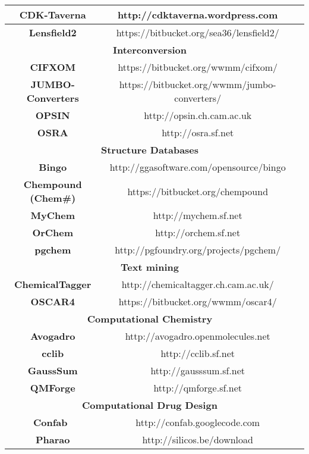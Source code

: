 \documentclass[10pt]{bmc_article}
\newenvironment{bmcformat}{\fussy\setboolean{publ}{true}}{\fussy}
\begin{document}
\begin{bmcformat}
{\begin{tabular}{|c|c|c|}
        \textbf{CDK-Taverna} & http://cdktaverna.wordpress.com \\ \hline
        \textbf{Lensfield2} & https://bitbucket.org/sea36/lensfield2/ \\ \hline
        \multicolumn{2}{|c|}{\textbf{Interconversion}} \\ \hline
        \textbf{CIFXOM} \cite{DayEtAl2011} & https://bitbucket.org/wwmm/cifxom/  \\ \hline
        \textbf{JUMBO-Converters} & https://bitbucket.org/wwmm/jumbo-converters/ \\ \hline
        \textbf{OPSIN} & http://opsin.ch.cam.ac.uk \\ \hline
        \textbf{OSRA} & http://osra.sf.net \\ \hline
        \multicolumn{2}{|c|}{\textbf{Structure Databases}} \\ \hline
        \textbf{Bingo}  & http://ggasoftware.com/opensource/bingo \\ \hline
        \textbf{Chempound (Chem\#)} & https://bitbucket.org/chempound \\ \hline
        \textbf{MyChem}  & http://mychem.sf.net \\ \hline
        \textbf{OrChem} & http://orchem.sf.net \\ \hline
        \textbf{pgchem}  & http://pgfoundry.org/projects/pgchem/ \\ \hline
        \multicolumn{2}{|c|}{\textbf{Text mining}} \\ \hline
        \textbf{ChemicalTagger} \cite{HawizyEtAl2011} & http://chemicaltagger.ch.cam.ac.uk/ \\ \hline
        \textbf{OSCAR4} & https://bitbucket.org/wwmm/oscar4/ \\ \hline
        \multicolumn{2}{|c|}{\textbf{Computational Chemistry}} \\ \hline
        \textbf{Avogadro} & http://avogadro.openmolecules.net \\ \hline
        \textbf{cclib}  & http://cclib.sf.net \\ \hline
        \textbf{GaussSum}  & http://gausssum.sf.net \\ \hline
        \textbf{QMForge}  & http://qmforge.sf.net \\ \hline
        \multicolumn{2}{|c|}{\textbf{Computational Drug Design}} \\ \hline
        \textbf{Confab}~\cite{Confab} & http://confab.googlecode.com \\ \hline
        \textbf{Pharao} & http://silicos.be/download \\ \hline

\end{tabular}}
\end{bmcformat}
\end{document}
